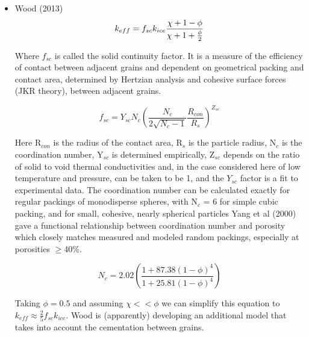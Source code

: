\documentclass[11pt]{article} %
\begin{document}
\begin{itemize}
	\begin{itemize}
	\item Wood (2013)
		\begin{equation}
		k_{eff}  = f_{sc} k_{ice} \frac{\chi + 1 - \phi}{\chi + 1 + \frac{\phi}{2}} \\
		\end{equation}
		
		Where $f_{sc}$ is called the solid continuity factor. It is a measure of the efficiency of contact between adjacent grains and dependent on geometrical packing and contact area, determined by Hertzian analysis and cohesive surface forces (JKR theory), between adjacent grains.
		
		\begin{equation}
		f_{sc} = Y_{sc}N_{c} \left( \frac{N_{c}}{2\sqrt{N_{c}-1}} \frac{R_{con}}{R_{s}} \right)^{Z_{sc}}
		\end{equation}
	
	Here R$_{con}$ is the radius of the contact area, R$_{s}$ is the particle radius, N$_{c}$ is the coordination number, Y$_{sc}$ is determined empirically, Z$_{sc}$ depends on the ratio of solid to void thermal conductivities and, in the case considered here of low temperature and pressure, can be taken to be 1, and the $Y_{sc}$ factor is a fit to experimental data. The coordination number can be calculated exactly for regular packings of monodisperse spheres, with N$_{c}$ = 6 for simple cubic packing, and for small, cohesive, nearly spherical particles Yang et al (2000) gave a functional relationship between coordination number and porosity which closely matches measured and modeled random packings, especially at porosities $\ge$40\%. 
	
	\begin{equation}
	N_{c} = 2.02 \left( \frac{1+87.38(1-\phi)^{4}}{1+25.81(1-\phi)^{4}} \right)
	\end{equation}
		
	Taking $\phi = 0.5$ and assuming $\chi << \phi$ we can simplify this equation to $k_{eff} \approx \frac{2}{5} f_{sc} k_{ice}$. Wood is (apparently) developing an additional model that takes into account the cementation between grains. 
		


\end{itemize}
\end{itemize}
\end{document}
